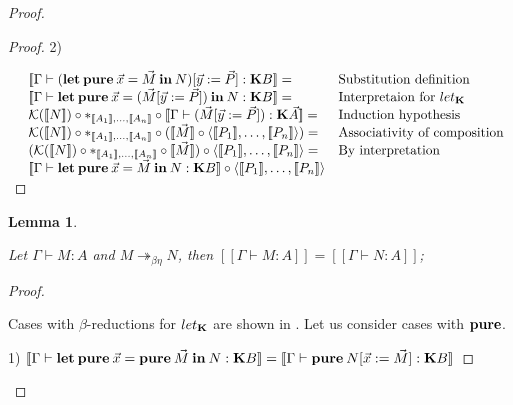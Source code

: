 \documentclass[a4paper]{article}
\newtheorem{lemma}{Lemma}
\begin{document}
\begin{proof}
\begin{proof}
\vspace{\baselineskip}

2)

\vspace{\baselineskip}

$\begin{array}{lll}
&[\![\Gamma \vdash ({\bf let \: pure} \: \vec{x} = \vec{M} {\: \bf in \:} N) [\vec{y} := \vec{P}] : {\bf K} B]\!] =& \text{Substitution definition}\\
&[\![\Gamma \vdash {\bf let \: pure} \: \vec{x} = (\vec{M} [\vec{y} := \vec{P}]) {\: \bf in \:} N : {\bf K}B]\!] =& \text{Interpretaion for $let_{\bf K}$} \\
&\mathcal{K}([\![N]\!]) \circ \ast_{[\![A_1]\!],\dots,[\![A_n]\!]} \circ [\![\Gamma \vdash (\vec{M} [\vec{y} := \vec{P}]) : {\bf K}\vec{A}]\!] =& \text{Induction hypothesis} \\
&\mathcal{K}([\![N]\!]) \circ \ast_{[\![A_1]\!],\dots,[\![A_n]\!]} \circ ([\![\vec{M}]\!] \circ \langle [\![P_1]\!],\dots,[\![P_n]\!]\rangle) = & \text{Associativity of composition} \\
&(\mathcal{K}([\![N]\!]) \circ \ast_{[\![A_1]\!],\dots,[\![A_n]\!]} \circ [\![\vec{M}]\!]) \circ \langle [\![P_1]\!],\dots,[\![P_n]\!]\rangle = & \text{By interpretation} \\
&[\![\Gamma \vdash {\bf let \: pure} \: \vec{x} = \vec{M} {\: \bf in \:} N : {\bf K}B]\!] \circ \langle [\![P_1]\!],\dots,[\![P_n]\!]\rangle&
\end{array}$

\end{proof}

\begin{lemma}
  $ $

  Let $\Gamma \vdash M : A$ and $M \twoheadrightarrow_{\beta \eta} N$, then $[\![\Gamma \vdash M : A]\!] = [\![\Gamma \vdash N : A]\!]$;
\end{lemma}

\begin{proof}
  $ $

Cases with $\beta$-reductions for $let_{\bf K}$ are shown in \cite{ModalK1}. Let us consider cases with ${\bf pure}$.

\vspace{\baselineskip}

1) $[\![\Gamma \vdash {\bf let \: pure \:} \vec{x} = {\bf pure \:} \vec{M} {\: \bf in \:} N : {\bf K}B]\!] = [\![\Gamma \vdash {\bf pure \:} N [\vec{x} := \vec{M}] : {\bf K}B]\!]$


\end{proof}
\end{proof}
\end{document}
